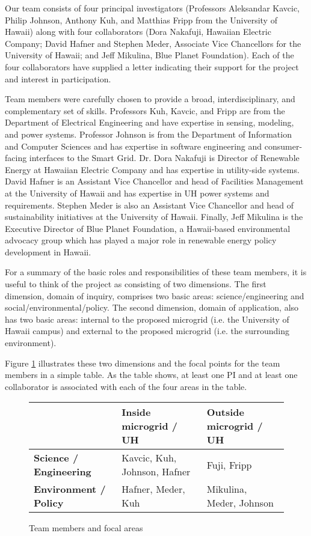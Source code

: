 Our team consists of four principal investigators (Professors Aleksandar
Kavcic, Philip Johnson, Anthony Kuh, and Matthias Fripp from the University
of Hawaii) along with four collaborators (Dora Nakafuji, Hawaiian Electric
Company; David Hafner and Stephen Meder, Associate Vice Chancellors for the
University of Hawaii; and Jeff Mikulina, Blue Planet Foundation).  Each of
the four collaborators have supplied a letter indicating their support for
the project and interest in participation.

Team members were carefully chosen to provide a broad, interdisciplinary,
and complementary set of skills. Professors Kuh, Kavcic, and Fripp are from
the Department of Electrical Engineering and have expertise in sensing,
modeling, and power systems.  Professor Johnson is from the Department of
Information and Computer Sciences and has expertise in software engineering
and consumer-facing interfaces to the Smart Grid.  Dr. Dora Nakafuji is
Director of Renewable Energy at Hawaiian Electric Company and has expertise
in utility-side systems. David Hafner is an Assistant Vice Chancellor and
head of Facilities Management at the University of Hawaii and has expertise
in UH power systems and requirements.  Stephen Meder is also an Assistant
Vice Chancellor and head of sustainability initiatives at the University of
Hawaii.  Finally, Jeff Mikulina is the Executive Director of Blue Planet
Foundation, a Hawaii-based environmental advocacy group which has played a
major role in renewable energy policy development in Hawaii.

For a summary of the basic roles and responsibilities of these team
members, it is useful to think of the project as consisting of two
dimensions.  The first dimension, domain of inquiry, comprises two basic
areas: science/engineering and social/environmental/policy.  The second
dimension, domain of application, also has two basic areas: internal to the
proposed microgrid (i.e. the University of Hawaii campus) and external to
the proposed microgrid (i.e. the surrounding environment).

Figure \ref{fig:team}
illustrates these two dimensions and the focal points for the team
members in a simple table.  As the table shows, at least one PI and at
least one collaborator is associated with each of the four areas in the
table. 


\begin{figure}
\begin{tabular}{|p{1.8in}|p{2.0in}|p{1.8in}|}
\hline
& {\bf Inside microgrid / UH} & {\bf Outside microgrid / UH}  \\ \hline
{\bf Science / Engineering} & Kavcic, Kuh, Johnson, Hafner & Fuji, Fripp \\ \hline
{\bf Environment / Policy} & Hafner, Meder, Kuh & Mikulina, Meder, Johnson \\ \hline
\end{tabular} 
\caption{Team members and focal areas}
\label{fig:team}
\end{figure}


